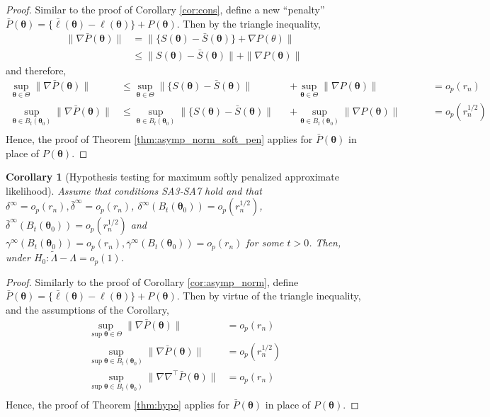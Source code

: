 \documentclass[11pt, a4paper]{article}
\newcommand*{\bb}{\boldsymbol}
\theoremstyle{example} \newtheorem{example}{Example}[section]
\theoremstyle{theorem} \newtheorem{theorem}{Theorem}[section]
\theoremstyle{theorem }\newtheorem{proposition}{Proposition}[section]
\theoremstyle{theorem }\newtheorem{corollary}{Corollary}[section]
\def\\bbeta{\bb{\\bbeta}}
\def\btheta{\bb{\theta}}
\def\btnod{\bb{\theta}_0}
\begin{document}
	\begin{proof}
		Similar to the proof of Corollary \ref{cor:cons}, define a new ``penalty'' $\bar{P}(\btheta) = \{\bar{\ell}(\btheta)-\ell(\btheta)\}  + P(\btheta)$. Then by the triangle inequality, 
		\begin{equation}
			\begin{aligned}
				\| \nabla \bar{P}(\btheta) \| &= \|\{S(\btheta)-\bar{S}(\btheta) \} + \nabla P(\theta) \| \\ 
				& \leq \|S(\btheta) - \bar{S}(\btheta) \| + \| \nabla P(\btheta) \| 
			\end{aligned}
		\end{equation}
		and therefore, 
		\begin{equation}
			\begin{aligned}
				\underset{\btheta \in \Theta}{\sup} 	\| \nabla \bar{P}(\btheta) \| & \leq \underset{\btheta \in \Theta}{\sup} \|\{S(\btheta)-\bar{S}(\btheta)\| &&+  \underset{\btheta \in \Theta}{\sup}\| \nabla P(\btheta) \|  &&&& = o_p(r_n) \\ 
				\underset{\btheta \in B_t(\btnod)}{\sup}	\| \nabla \bar{P}(\btheta) \| &\leq \underset{\btheta \in B_t(\btnod)}{\sup} \|\{S(\btheta)-\bar{S}(\btheta) \| &&+ \underset{\btheta \in B_t(\btnod)}{\sup}\| \nabla P(\btheta) \|  &&&& = o_p(r_n^{1/2}) \\ 
			\end{aligned}
		\end{equation}
		Hence, the proof of Theorem \ref{thm:asymp_norm_soft_pen} applies for $\bar{P}(\btheta)$ in place of $P(\btheta)$.
	\end{proof}
	\begin{corollary}[Hypothesis testing for maximum softly penalized approximate likelihood]
		Assume that conditions SA3-SA7 hold and that $\delta^\infty = o_p(r_n), \bar{\delta}^\infty = o_p(r_n)$, $\delta^\infty(B_t(\btnod)) = o_p(r_n^{1/2})$,\linebreak $\bar{\delta}^\infty(B_t(\btnod)) = o_p(r_n^{1/2})$ and $\gamma^\infty(B_t(\btnod)) = o_p(r_n), \bar{\gamma}^\infty(B_t(\btnod)) = o_p(r_n)$ for some $t>0$. Then, under $H_0: \tilde{\Lambda} - \Lambda = o_p(1)$.
	\end{corollary}
	\begin{proof}
		Similarly to the proof of Corollary \ref{cor:asymp_norm}, define $\bar{P}(\btheta) = \{\bar{\ell}(\btheta)-\ell(\btheta)\} + P(\btheta)$. Then by virtue of the triangle inequality, and the assumptions of the Corollary, 
		\begin{equation}
			\begin{aligned}
				\underset{\sup \btheta \in \Theta}{\sup} \| \nabla \bar{P}(\btheta) \| &= o_p(r_n) \\ 
				\underset{\sup \btheta \in B_t(\btnod)}{\sup} \| \nabla \bar{P}(\btheta) \| &= o_p(r_n^{1/2}) \\
				\underset{\sup \btheta \in B_t(\btnod)}{\sup} \| \nabla \nabla^\top \bar{P}(\btheta) \| &= o_p(r_n) \\
			\end{aligned}
		\end{equation}
		Hence, the proof of Theorem \ref{thm:hypo} applies for $\bar{P}(\btheta)$ in place of $P(\btheta)$.
	\end{proof}
\end{document}
